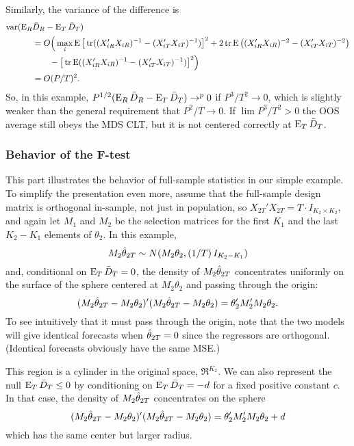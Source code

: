 \documentclass[12pt]{article}
\begin{document}
Similarly, the variance of the difference is
\begin{align*}
  \operatorname{var}(\operatorname{E}_R & \bar{D}_{R} - \operatorname{E}_T \bar{D}_{T}) \\ &=
  O\Big(\max_i \operatorname{E}\big[\operatorname{tr}((X_{iR}'X_{iR})^{-1} - (X_{iT}'X_{iT})^{-1})\big]^2
  + 2 \operatorname{tr} \operatorname{E}\big((X_{iR}'X_{iR})^{-2} - (X_{iT}'X_{iT})^{-2}\big) \\
  &\qquad - \big[\operatorname{tr} \operatorname{E}((X_{iR}'X_{iR})^{-1} - (X_{iT}'X_{iT})^{-1}) \big]^2 \Big)\\
  &= O(P/T)^2.
\end{align*}
So, in this example, $P^{1/2}(\operatorname{E}_R \bar{D}_{R} - \operatorname{E}_T \bar{D}_{T}) \to^p 0$
if $P^3/T^2 \to 0$, which is slightly weaker than the general
requirement that $P^2/T \to 0$.  If $\lim P^3/T^2 > 0$ the OOS average
still obeys the MDS CLT, but it is not centered correctly at $\operatorname{E}_T
\bar{D}_{T}$.

\subsubsection*{Behavior of the F-test}

This part illustrates the behavior of full-sample statistics in our
simple example. To simplify the presentation even more, assume that
the full-sample design matrix is orthogonal in-sample, not just in
population, so $X_{2T}'X_{2T} = T \cdot I_{K_2 \times K_2}$, and again
let $M_1$ and $M_2$ be the selection matrices for the first $K_1$ and
the last $K_2-K_1$ elements of $\theta_2$. In this example,
\begin{equation*}
  M_2 \hat\theta_{2T} \sim
  N(M_2 \theta_2, (1/T) \, I_{K_2-K_1})
\end{equation*}
and, conditional on $\operatorname{E}_T \bar{D}_{T} = 0$, the density of $M_2 \hat\theta_{2T}$
concentrates uniformly on the surface of the sphere centered at $M_2
\theta_2$ and passing through the origin:
\begin{equation*}
  (M_2 \hat\theta_{2T} - M_2 \theta_2)'(M_2 \hat\theta_{2T} - M_2 \theta_2) =
  \theta_2'M_2' M_2 \theta_2.
\end{equation*}
To see intuitively that it must pass through the origin, note that the
two models will give identical forecasts when $\hat\theta_{2T} = 0$ since the
regressors are orthogonal. (Identical forecasts obviously have the
same MSE.)

This region is a cylinder in the original space, $\Re^{K_2}$.  We can
also represent the null $\operatorname{E}_T \bar{D}_{T} \leq 0$ by conditioning on $\operatorname{E}_T
\bar{D}_{T} = -d$ for a fixed positive constant $c$. In that case, the
density of $M_2 \hat\theta_{2T}$ concentrates on the sphere
\begin{equation*}
  (M_2 \hat\theta_{2T} - M_2 \theta_2)'(M_2 \hat\theta_{2T} - M_2 \theta_2) =
  \theta_2'M_2' M_2 \theta_2 + d
\end{equation*}
which has the same center but larger radius.
\end{document}
